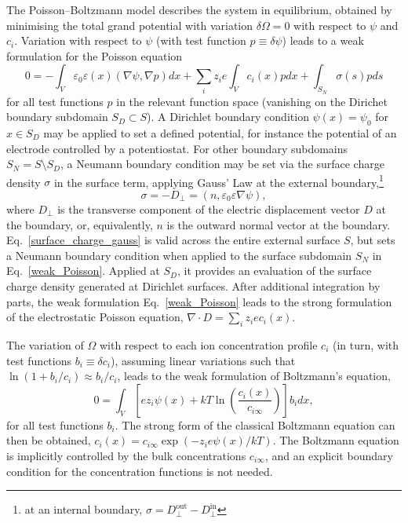 The Poisson--Boltzmann model describes the system in equilibrium,
obtained by minimising the total grand potential with variation
$\delta\Omega=0$ with respect to $\psi$ and $c_i$. Variation with
respect to $\psi$ (with test function $p \equiv \delta \psi$) leads to a weak formulation
for the Poisson equation
\begin{equation}
    0 = -\int_{V} \varepsilon_{0}\varepsilon(x) (\nabla\psi,\nabla p) dx + \sum_{i}z_i e \int_{V} c_{i}(x) p dx + \int_{S_{N}} \sigma(s) p ds
    \label{weak_Poisson}
\end{equation}
for all test functions $p$ in the relevant function space (vanishing
on the Dirichet boundary subdomain $S_{D} \subset S$).  A Dirichlet boundary
condition $\psi(x)=\psi_{0}$ for $x \in S_{D}$ may be applied to set a defined potential,
for instance the potential of an  electrode controlled by a
potentiostat. For other boundary subdomains $S_{N} = S \setminus
S_{D}$, a Neumann boundary condition may be set via the surface
charge density $\sigma$ in the surface term, applying Gauss' Law at
the external boundary,\footnote{at an internal boundary, $\sigma=D^{\text{out}}_{\perp}-D^{\text{in}}_{\perp}$}
\begin{equation}
  \sigma = -D_{\perp} = (n, \varepsilon_{0}\varepsilon\nabla \psi),
  \label{surface_charge_gauss}
\end{equation}
where $D_{\perp}$ is the transverse component of the electric
displacement vector $D$ at the boundary, or, equivalently, $n$ is the
outward normal vector at the boundary. Eq.~\eqref{surface_charge_gauss}
is valid across the entire  external surface $S$, but sets a Neumann
boundary condition when applied to the surface subdomain
$S_{N}$ in Eq.~\eqref{weak_Poisson}. Applied at $S_{D}$, it provides an
evaluation of the surface charge density generated at Dirichlet surfaces.
 After additional
integration by parts, the weak formulation Eq.~\eqref{weak_Poisson} leads to the strong
formulation of the electrostatic Poisson equation,
$\nabla\cdot D = \sum_i z_i e c_{i}(x)$.

The variation of $\Omega$ with
respect to each ion concentration profile $c_i$ (in turn, with test
functions $b_i\equiv \delta c_i$), assuming linear variations such that
$\ln(1+b_i/c_i)\approx b_i/c_i$, leads to the weak formulation of Boltzmann's
equation,
\begin{equation}
    0 = \int_{V} \left[ e z_i \psi(x)
    + kT \ln\left(\frac{c_i(x)}{c_{i\infty}}\right)
  \right] b_i dx,
    \label{weak_Boltzmann}
\end{equation}
for all test functions $b_i$. The strong form of the classical
Boltzmann equation can then be obtained, $c_i(x)=c_{i\infty}\exp(-z_i
e \psi(x)/kT)$.  The Boltzmann equation is implicitly controlled by
the bulk concentrations $c_{i\infty}$, and an explicit boundary condition
for the concentration functions is not needed.

